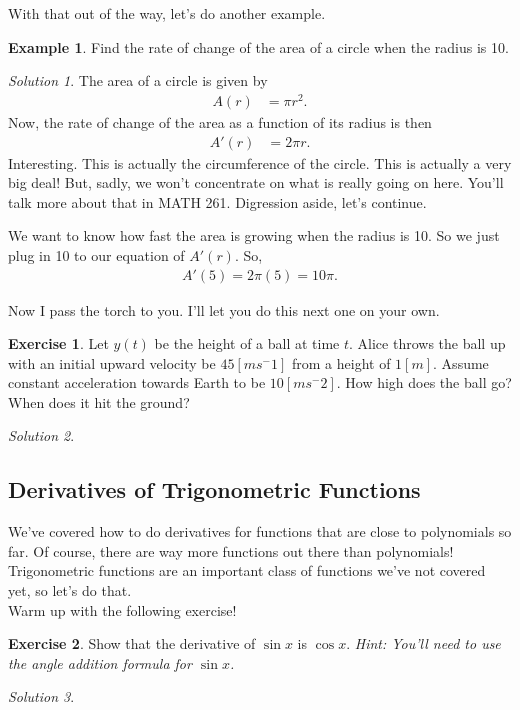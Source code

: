 \documentclass[leqno]{article}
\theoremstyle{definition}
\newtheorem{example}{Example}[section]
\newtheorem{exercise}{Exercise}[section]
\theoremstyle{remark}
\newtheorem*{solution}{Solution}
\theoremstyle{theorem}
\begin{document}
With that out of the way, let's do another example.
\begin{example}
Find the rate of change of the area of a circle when the radius is 10.  
\begin{solution}
The area of a circle is given by 
\begin{align*}
A(r)&=\pi r^2.
\end{align*}
Now, the rate of change of the area as a function of its radius is then 
\begin{align*}
A'(r)&=2\pi r.
\end{align*}
Interesting.  This is actually the circumference of the circle.  This is actually a very big deal!  But, sadly, we won't concentrate on what is really going on here.  You'll talk more about that in MATH 261. Digression aside, let's continue.

We want to know how fast the area is growing when the radius is 10.  So we just plug in 10 to our equation of $A'(r)$. So,
\begin{align*}
A'(5)=2\pi(5)=10\pi.
\end{align*}
\end{solution}
\end{example}


\noindent Now I pass the torch to you.  I'll let you do this next one on your own.
\begin{exercise}
Let $y(t)$ be the height of a ball at time $t$.  Alice throws the ball up with an initial upward velocity be $45[ms^-1]$ from a height of $1[m]$.  Assume constant acceleration towards Earth to be $10[ms^-2]$. How high does the ball go? When does it hit the ground? 
\begin{solution}~
\vspace*{10cm}
\end{solution}
\end{exercise}


\subsection{Derivatives of Trigonometric Functions}

We've covered how to do derivatives for functions that are close to polynomials so far.  Of course, there are way more functions out there than polynomials!  Trigonometric functions are an important class of functions we've not covered yet, so let's do that.\\

\noindent Warm up with the following exercise! 
\begin{exercise}
Show that the derivative of $\sin x$ is $\cos x$. \emph{Hint: You'll need to use the angle addition formula for $\sin x$.}
\begin{solution}
\vspace*{6cm}
\end{solution}
\end{exercise}
\end{document}

